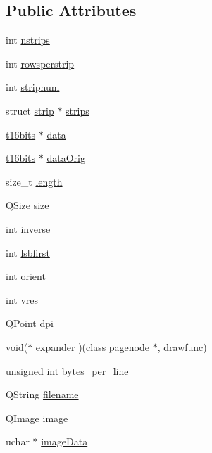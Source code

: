 \subsection*{Public Attributes}
\begin{DoxyCompactItemize}
\item 
int \hyperlink{classpagenode_a0568e4ac37e1a71573a2056e308cd8ee}{nstrips}
\item 
int \hyperlink{classpagenode_a728753690c18f318610ba9de5cf6f798}{rowsperstrip}
\item 
int \hyperlink{classpagenode_ac72e589a7653741a7a5b3c44e1bdddc3}{stripnum}
\item 
struct \hyperlink{structstrip}{strip} $\ast$ \hyperlink{classpagenode_a75866934e4e0cd1d789a1830dea955fb}{strips}
\item 
\hyperlink{faxexpand_8h_adbe0cc2e2aa9b9127df55d505f059631}{t16bits} $\ast$ \hyperlink{classpagenode_af5c9ccfd1af1ac996caeb2518cbc739d}{data}
\item 
\hyperlink{faxexpand_8h_adbe0cc2e2aa9b9127df55d505f059631}{t16bits} $\ast$ \hyperlink{classpagenode_a9f39d34f728116ceb5b9b4935c905aa1}{data\+Orig}
\item 
size\+\_\+t \hyperlink{classpagenode_af5305c29fc27e5fe3ebd35d7d72927bb}{length}
\item 
Q\+Size \hyperlink{classpagenode_a2be79286e9fc2179f6e3f97dc72a56fa}{size}
\item 
int \hyperlink{classpagenode_a1cfd8455a2333e46d88143d6a54af947}{inverse}
\item 
int \hyperlink{classpagenode_a9febd846854e535bfe718b166e0ea7e7}{lsbfirst}
\item 
int \hyperlink{classpagenode_a1ba73a4704d3934e92b354cda5bd7ba5}{orient}
\item 
int \hyperlink{classpagenode_aa1341d0cb5be8f02e2c7cafd5d690a7b}{vres}
\item 
Q\+Point \hyperlink{classpagenode_a9d18577d1e468f4585554fa5b767e000}{dpi}
\item 
void($\ast$ \hyperlink{classpagenode_a5e63779f24772ae97401d828bc75c099}{expander} )(class \hyperlink{classpagenode}{pagenode} $\ast$, \hyperlink{faxexpand_8h_ac0e224bb80ed597fc5cf7ac628e9ad5c}{drawfunc})
\item 
unsigned int \hyperlink{classpagenode_a6880dcb0b3fb63497eca31a45c7484f9}{bytes\+\_\+per\+\_\+line}
\item 
Q\+String \hyperlink{classpagenode_a0e79881e9e13c6f357162067036344f0}{filename}
\item 
Q\+Image \hyperlink{classpagenode_a266b69a103ed430ef3a793d134d596d0}{image}
\item 
uchar $\ast$ \hyperlink{classpagenode_a879eb55073bbccadfadc524708452fcc}{image\+Data}
\end{DoxyCompactItemize}


